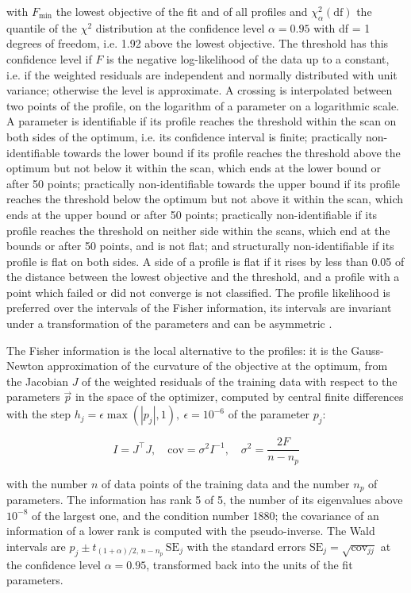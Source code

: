 \documentclass{article}
\begin{document}
with $F_{\min}$ the lowest objective of the fit and of all profiles and $\chi^2_{\alpha}(\mathrm{df})$ the quantile of the $\chi^2$ distribution at the confidence level $\alpha = 0.95$ with df = 1 degrees of freedom, i.e. 1.92 above the lowest objective. The threshold has this confidence level if $F$ is the negative log-likelihood of the data up to a constant, i.e. if the weighted residuals are independent and normally distributed with unit variance; otherwise the level is approximate. A crossing is interpolated between two points of the profile, on the logarithm of a parameter on a logarithmic scale. A parameter is identifiable if its profile reaches the threshold within the scan on both sides of the optimum, i.e. its confidence interval is finite; practically non-identifiable towards the lower bound if its profile reaches the threshold above the optimum but not below it within the scan, which ends at the lower bound or after 50 points; practically non-identifiable towards the upper bound if its profile reaches the threshold below the optimum but not above it within the scan, which ends at the upper bound or after 50 points; practically non-identifiable if its profile reaches the threshold on neither side within the scans, which end at the bounds or after 50 points, and is not flat; and structurally non-identifiable if its profile is flat on both sides. A side of a profile is flat if it rises by less than 0.05 of the distance between the lowest objective and the threshold, and a profile with a point which failed or did not converge is not classified. The profile likelihood is preferred over the intervals of the Fisher information, its intervals are invariant under a transformation of the parameters and can be asymmetric \cite{Wieland2021}.

The Fisher information is the local alternative to the profiles: it is the Gauss-Newton approximation of the curvature of the objective at the optimum, from the Jacobian $J$ of the weighted residuals of the training data with respect to the parameters $\vec{p}$ in the space of the optimizer, computed by central finite differences with the step $h_j = \epsilon \max(|p_j|, 1),\ \epsilon = 10^{-6}$ of the parameter $p_j$:

\begin{equation}
I = J^\top J, \quad \mathrm{cov} = \sigma^2 I^{-1}, \quad \sigma^2 = \frac{2 F}{n - n_p}
\end{equation}

with the number $n$ of data points of the training data and the number $n_p$ of parameters. The information has rank 5 of 5, the number of its eigenvalues above $10^{-8}$ of the largest one, and the condition number 1880; the covariance of an information of a lower rank is computed with the pseudo-inverse. The Wald intervals are $\hat{p}_j \pm t_{(1+\alpha)/2,\, n-n_p}\, \mathrm{SE}_j$ with the standard errors $\mathrm{SE}_j = \sqrt{\mathrm{cov}_{jj}}$ at the confidence level $\alpha = 0.95$, transformed back into the units of the fit parameters.
\end{document}
